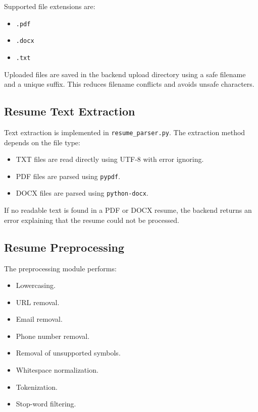 \documentclass[12pt,a4paper]{article}
\begin{document}
Supported file extensions are:

\begin{itemize}
    \item \texttt{.pdf}
    \item \texttt{.docx}
    \item \texttt{.txt}
\end{itemize}

Uploaded files are saved in the backend upload directory using a safe filename and a unique suffix. This reduces filename conflicts and avoids unsafe characters.

\subsection{Resume Text Extraction}

Text extraction is implemented in \texttt{resume\_parser.py}. The extraction method depends on the file type:

\begin{itemize}
    \item TXT files are read directly using UTF-8 with error ignoring.
    \item PDF files are parsed using \texttt{pypdf}.
    \item DOCX files are parsed using \texttt{python-docx}.
\end{itemize}

If no readable text is found in a PDF or DOCX resume, the backend returns an error explaining that the resume could not be processed.

\subsection{Resume Preprocessing}

The preprocessing module performs:

\begin{itemize}
    \item Lowercasing.
    \item URL removal.
    \item Email removal.
    \item Phone number removal.
    \item Removal of unsupported symbols.
    \item Whitespace normalization.
    \item Tokenization.
    \item Stop-word filtering.
\end{itemize}
\end{document}
